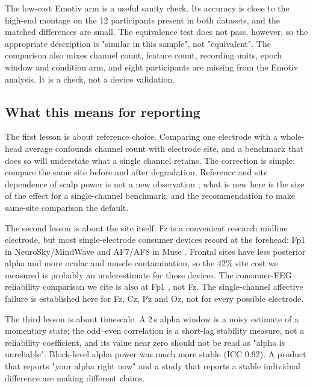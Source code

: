The low-cost Emotiv arm is a useful sanity check. Its accuracy is close to the high-end
montage on the 12 participants present in both datasets, and the matched differences are
small. The equivalence test does not pass, however, so the appropriate description is
"similar in this sample", not "equivalent". The comparison also mixes channel count,
feature count, recording units, epoch window and condition arm, and eight participants
are missing from the Emotiv analysis. It is a check, not a device validation.

\subsection*{What this means for reporting}
The first lesson is about reference choice. Comparing one electrode with a whole-head
average confounds channel count with electrode site, and a benchmark that does so will
understate what a single channel retains. The correction is simple: compare the same
site before and after degradation. Reference and site dependence of scalp power is not a
new observation \citep{hagemann2001reference}; what is new here is the size of the effect
for a single-channel benchmark, and the recommendation to make same-site comparison the
default.

The second lesson is about the site itself. Fz is a convenient research midline
electrode, but most single-electrode consumer devices record at the forehead: Fp1 in
NeuroSky/MindWave and AF7/AF8 in Muse \citep{krigolson2017muse,cannard2021muse}. Frontal
sites have less posterior alpha and more ocular and muscle contamination, so the 42\%
site cost we measured is probably an underestimate for those devices. The consumer-EEG
reliability comparison we cite is also at Fp1 \citep{rogers2016reliability}, not Fz. The
single-channel affective failure is established here for Fz, Cz, Pz and Oz, not for every
possible electrode.

The third lesson is about timescale. A 2\,s alpha window is a noisy estimate of a
momentary state; the odd--even correlation is a short-lag stability measure, not a
reliability coefficient, and its value near zero should not be read as "alpha is
unreliable". Block-level alpha power was much more stable (ICC 0.92). A product that
reports "your alpha right now" and a study that reports a stable individual difference
are making different claims.

